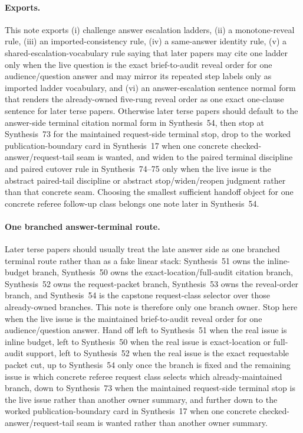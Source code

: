 \documentclass[11pt]{article}
\begin{document}
\paragraph{Exports.}
This note exports (i) challenge answer escalation ladders, (ii) a monotone-reveal rule, (iii) an imported-consistency rule, (iv) a same-answer identity rule, (v) a shared-escalation-vocabulary rule saying that later papers may cite one ladder only when the live question is the exact brief-to-audit reveal order for one audience/question answer and may mirror its repeated step labels only as imported ladder vocabulary, and (vi) an answer-escalation sentence normal form that renders the already-owned five-rung reveal order as one exact one-clause sentence for later terse papers. Otherwise later terse papers should default to the answer-side terminal citation normal form in Synthesis~54, then stop at Synthesis~73 for the maintained request-side terminal stop, drop to the worked publication-boundary card in Synthesis~17 when one concrete checked-answer/request-tail seam is wanted, and widen to the paired terminal discipline and paired cutover rule in Synthesis~74--75 only when the live issue is the abstract paired-tail discipline or abstract stop/widen/reopen judgment rather than that concrete seam. Choosing the smallest sufficient handoff object for one concrete referee follow-up class belongs one note later in Synthesis~54.\cite{series:challengeanswerreviewmenus,series:workedexample,series:pairedterminalcitationdiscipline,series:pairedterminalcutoverrules}

\paragraph{One branched answer-terminal route.}
Later terse papers should usually treat the late answer side as one branched terminal route rather than as a fake linear stack: Synthesis~51 owns the inline-budget branch, Synthesis~50 owns the exact-location/full-audit citation branch, Synthesis~52 owns the request-packet branch, Synthesis~53 owns the reveal-order branch, and Synthesis~54 is the capstone request-class selector over those already-owned branches. This note is therefore only one branch owner. Stop here when the live issue is the maintained brief-to-audit reveal order for one audience/question answer. Hand off left to Synthesis~51 when the real issue is inline budget, left to Synthesis~50 when the real issue is exact-location or full-audit support, left to Synthesis~52 when the real issue is the exact requestable packet cut, up to Synthesis~54 only once the branch is fixed and the remaining issue is which concrete referee request class selects which already-maintained branch, down to Synthesis~73 when the maintained request-side terminal stop is the live issue rather than another owner summary, and further down to the worked publication-boundary card in Synthesis~17 when one concrete checked-answer/request-tail seam is wanted rather than another owner summary.
\end{document}
